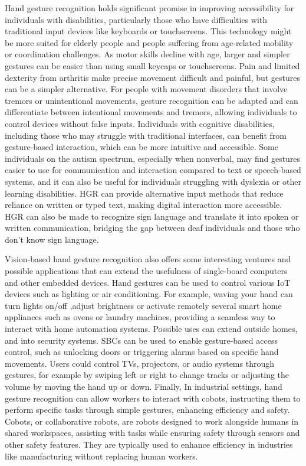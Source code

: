 \documentclass[12pt]{article}
\begin{document}
Hand gesture recognition holds significant promise in improving accessibility for individuals with disabilities, particularly those who have difficulties with traditional input devices like keyboards or touchscreens.
This technology might be more suited for elderly people and people suffering from age-related mobility or coordination challenges. As motor skills decline with age, larger and simpler gestures can be easier than using small keycaps or touchscreens.
Pain and limited dexterity from arthritis make precise movement difficult and painful, but gestures can be a simpler alternative. For people with movement disorders that involve tremors or unintentional movements, gesture recognition can be adapted and can differentiate between intentional movements and tremors, allowing individuals to control devices without false inputs.
Individuals with cognitive disabilities, including those who may struggle with traditional interfaces, can benefit from gesture-based interaction, which can be more intuitive and accessible. Some individuals on the autism spectrum, especially when nonverbal, may find gestures easier to use for communication and interaction compared to text or speech-based systems, and it can also be useful for individuals struggling with dyslexia or other learning disabilities. HGR can provide alternative input methods that reduce reliance on written or typed text, making digital interaction more accessible.
HGR can also be made to recognize sign language and translate it into spoken or written communication, bridging the gap between deaf individuals and those who don’t know sign language.

Vision-based hand gesture recognition also offers some interesting ventures and possible applications that can extend the usefulness of single-board computers and other embedded devices. Hand gestures can be used to control various IoT devices such as lighting or air conditioning. For example, waving your hand can turn lights on/off ,adjust brightness or activate remotely several smart home appliances such as ovens or laundry machines, providing a seamless way to interact with home automation systems. Possible uses can extend outside homes, and into security systems. SBCs can be used to enable gesture-based access control, such as unlocking doors or triggering alarms based on specific hand movements. Users could control TVs, projectors, or audio systems through gestures, for example by swiping left or right to change tracks or adjusting the volume by moving the hand up or down. Finally, In industrial settings, hand gesture recognition can allow workers to interact with cobots, instructing them to perform specific tasks through simple gestures, enhancing efficiency and safety. Cobots, or collaborative robots, are robots designed to work alongside humans in shared workspaces, assisting with tasks while ensuring safety through sensors and other safety features. They are typically used to enhance efficiency in industries like manufacturing without replacing human workers.
\end{document}
